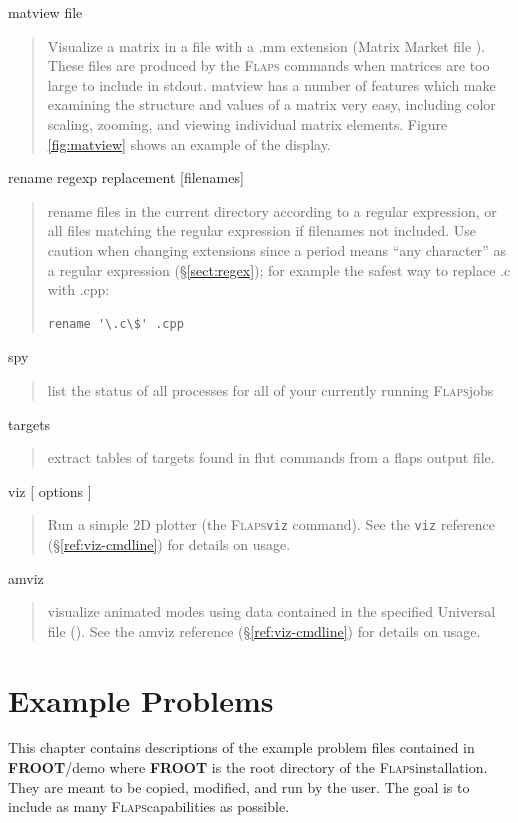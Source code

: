 \documentclass[11pt,openany,twoside]{book}
\numberwithin{equation}{section}		%
\newcommand{\Cmd}[1]{{\sf #1}}
\newcommand{\UserIn}[1]{{\small\sf\bf #1}}
\newcommand{\Code}[1]{{\small\tt #1}}
\newcommand{\Subst}[1]{{\small\sf #1}}
\newcommand{\Flaps}{\textsc{Flaps\:}}
\newcommand{\Froot}{\UserIn{FROOT\/}}
\newcommand{\Spec}[1]{{\small\ttfamily #1}}
\newcommand{\Sectref}[1]{\S\ref{#1}}
\begin{document}
\Spec{matview \Subst{file\/}}
\begin{quote}
Visualize a matrix in a file with a \Cmd{.mm} extension
(Matrix Market file \cite{matrixmarket}).
These files are produced by the \Flaps
commands when matrices are too large to include in stdout.
\Cmd{matview} has a number of features which
make examining the structure and values of a matrix very easy,
including color scaling, zooming, and viewing individual matrix
elements. Figure \ref{fig:matview} shows an example of the display.
\end{quote}

\Spec{rename \Subst{regexp} \Subst{replacement} [\Subst{filenames}]}
\begin{quote}
rename files in the current directory according to a regular expression,
or all files matching the regular expression if \Subst{filenames} not included.
Use caution when changing extensions since a period means ``any character''
as a regular expression (\Sectref{sect:regex});
for example the safest way to replace .c with .cpp:
\begin{lstlisting}
rename '\.c\$' .cpp
\end{lstlisting}
\end{quote}

\Spec{spy}
\begin{quote}
list the status of all processes for all of your
currently running \Flaps jobs
\end{quote}

\Spec{targets}
\begin{quote}
extract tables of targets found in \Cmd{flut} commands from a \Cmd{flaps}
output file.
\end{quote}

\Spec{viz [ \Subst{options} ] }
\begin{quote}
Run a simple 2D plotter (the \Flaps \Code{viz} command).
See the \Code{viz} reference (\Sectref{ref:viz-cmdline})
for details on usage.
\end{quote}

\Spec{amviz}
\begin{quote}
visualize animated modes using data contained in the specified
Universal file (\cite{UniversalFile}).
See the \Cmd{amviz} reference (\Sectref{ref:viz-cmdline})
for details on usage.
\end{quote}

\newpage
\chapter{Example Problems}\label{chap:examples}
This chapter contains descriptions of the example problem files
contained in \Froot/demo where \Froot \index{FROOT@\Froot} is the root directory of
the \Flaps installation.
They are meant to be copied, modified,
and run by the user. The goal is to include as many \Flaps capabilities
as possible.
\end{document}
